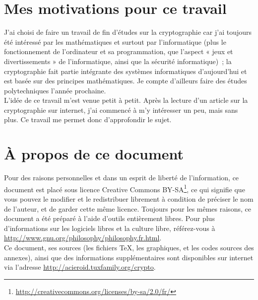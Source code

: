 
\section{Mes motivations pour ce travail}
J'ai choisi de faire un travail de fin d'études sur la cryptographie
car j'ai toujours été intéressé par les mathématiques et surtout par
l'informatique (plus le fonctionnement de l'ordinateur et sa
programmation, que l'aspect « jeux et divertissements » de
l'informatique, ainsi que la sécurité informatique)~;
la cryptographie fait partie intégrante des
systèmes informatiques d'aujourd'hui et est basée sur des principes
mathématiques. Je compte d'ailleurs faire des études polytechniques
l'année prochaine. \\ L'idée de ce travail m'est venue petit à
petit. Après la lecture d'un article sur la cryptographie sur
internet, j'ai commencé à m'y intéresser un peu, mais sans plus.
 Ce travail me permet donc d'approfondir le sujet.

\section{À propos de ce document}
Pour des raisons personnelles et dans un esprit de liberté de
l'information, ce document est placé sous licence Creative Commons
BY-SA\footnote{\url{http://creativecommons.org/licenses/by-sa/2.0/fr/}}, ce qui
signifie que vous pouvez le modifier et le redistribuer librement à
condition de préciser le nom de l'auteur, et de garder cette même
licence. Toujours pour les mêmes raisons, ce document a été préparé à
l'aide d'outils entièrement libres.
Pour plus d'informations sur les logiciels libres et la culture
libre, référez-vous à \url{http://www.gnu.org/philosophy/philosophy.fr.html}. \\
Ce document, ses sources (les fichiers \TeX, les graphiques, et les
codes sources des annexes), ainsi que des informations supplémentaires
sont disponibles sur internet via l'adresse
\url{http://acieroid.tuxfamily.org/crypto}. \\


